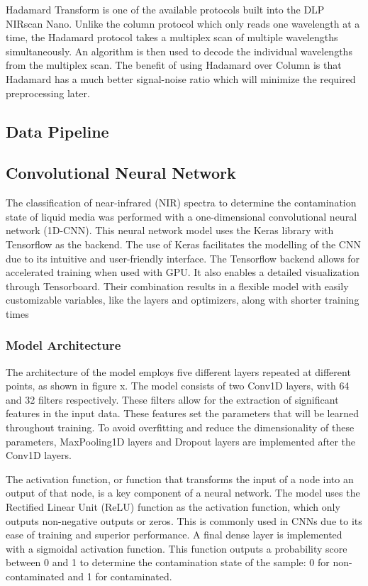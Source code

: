 \documentclass[12pt]{report}
\renewcommand{\cite}{\supercite}
\begin{document}
Hadamard Transform is one of the available protocols built into the DLP NIRscan Nano. Unlike the column protocol which only reads one wavelength at a time, the Hadamard protocol takes a multiplex scan of multiple wavelengths simultaneously. An algorithm is then used to decode the individual wavelengths from the multiplex scan. The benefit of using Hadamard over Column is that Hadamard has a much better signal-noise ratio which will minimize the required preprocessing later.

\subsection{Data Pipeline}

\subsection{Convolutional Neural Network}

The classification of near-infrared (NIR) spectra to determine the contamination state of liquid media was performed with a one-dimensional convolutional neural network (1D-CNN). This neural network model uses the Keras library with Tensorflow as the backend. The use of Keras facilitates the modelling of the CNN due to its intuitive and user-friendly interface.\cite{kerasteam_keras} The Tensorflow backend allows for accelerated training when used with GPU.\cite{acecloudteam_2024_tensorflow} It also enables a detailed visualization through Tensorboard. Their combination results in a flexible model with easily customizable variables, like the layers and optimizers, along with shorter training times	

\subsubsection{Model Architecture}

The architecture of the model employs five different layers repeated at different points, as shown in figure x. The model consists of two Conv1D layers, with 64 and 32 filters respectively. These filters allow for the extraction of significant features in the input data.\cite{nisha_2020_applications} These features set the parameters that will be learned throughout training. To avoid overfitting and reduce the dimensionality of these parameters, MaxPooling1D layers and Dropout layers are implemented after the Conv1D layers.

The activation function, or function that transforms the input of a node into an output of that node, is a key component of a neural network. The model uses the Rectified Linear Unit (ReLU) function as the activation function, which only outputs non-negative outputs or zeros.\cite{brownlee_2019_a} This is commonly used in CNNs due to its ease of training and superior performance. A final dense layer is implemented with a sigmoidal activation function. This function outputs a probability score between 0 and 1 to determine the contamination state of the sample: 0 for non-contaminated and 1 for contaminated.\cite{saeed_2021_a} 
\end{document}
